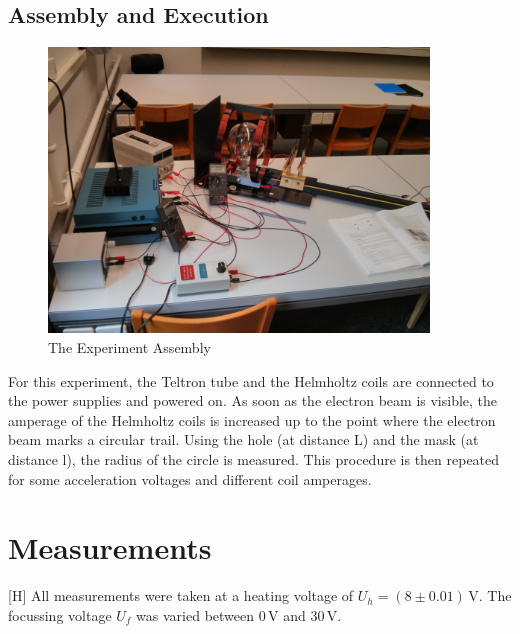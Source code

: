 \documentclass{scrreprt}
\newcommand{\unit}[1]{\ensuremath{\, \mathrm{#1}}}
\begin{document}
\subsection{Assembly and Execution}
\begin{figure}[H]
	\centering
  \includegraphics[width=0.9\textwidth]{img/assembly.jpg}
	\caption{The Experiment Assembly}
	\label{fig:assembly}
\end{figure}
For this experiment, the Teltron tube and the Helmholtz coils are connected to the power supplies and powered on. As soon as the electron beam is visible, the amperage of the Helmholtz coils is increased up to the point where the electron beam marks a circular trail. Using the hole (at distance L) and the mask (at distance l), the radius of the circle is measured. This procedure is then repeated for some acceleration voltages and different coil amperages.

\newpage
\section{Measurements}[H]
All measurements were taken at a heating voltage of $U_h = (8 \pm 0.01) \unit{V}$. The focussing voltage $U_f$ was varied between $0 \unit{V}$ and $30 \unit{V}$.
\end{document}

